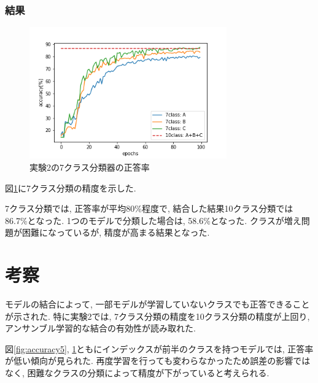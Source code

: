 \documentclass[twocolumn]{jarticle}     %
\begin{document}
\subsubsection{結果}

\begin{figure}[tb]
	\begin{center}
		\includegraphics[clip,width=8.5cm]{accuracy7.png}
		\caption{実験2の7クラス分類器の正答率}
		\label{fig:accuracy7}
	\end{center}
\end{figure}

図\ref{fig:accuracy7}に7クラス分類の精度を示した.

7クラス分類では, 正答率が平均80\%程度で, 結合した結果10クラス分類では86.7\%となった.
1つのモデルで分類した場合は, 58.6\%となった.
クラスが増え問題が困難になっているが, 精度が高まる結果となった.

\section{考察}



モデルの結合によって, 一部モデルが学習していないクラスでも正答できることが示された.
特に実験2では, 7クラス分類の精度を10クラス分類の精度が上回り, アンサンブル学習的な結合の有効性が読み取れた.

図\ref{fig:accuracy5}, \ref{fig:accuracy7}ともにインデックスが前半のクラスを持つモデルでは, 正答率が低い傾向が見られた. 再度学習を行っても変わらなかったため誤差の影響ではなく, 困難なクラスの分類によって精度が下がっていると考えられる.
\end{document}
